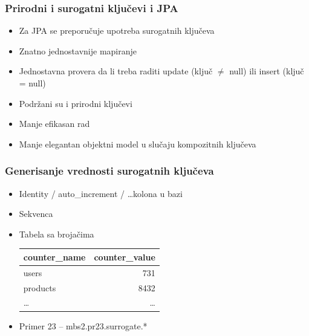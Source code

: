\documentclass[compress]{beamer}
\begin{document}
\begin{frame}
  \frametitle{Prirodni i surogatni ključevi i JPA}
  \begin{itemize}
    \item Za JPA se preporučuje upotreba surogatnih ključeva
    \item Znatno jednostavnije mapiranje
    \item Jednostavna provera da li treba raditi update (ključ $\neq$ null) ili insert (ključ = null)
  \end{itemize}

  \begin{itemize}
    \item Podržani su i prirodni ključevi
    \item Manje efikasan rad
    \item Manje elegantan objektni model u slučaju kompozitnih ključeva
  \end{itemize}
\end{frame}
\begin{frame}
  \frametitle{Generisanje vrednosti surogatnih ključeva}
  \begin{itemize}
    \item Identity / auto\_increment / \ldots kolona u bazi
    \item Sekvenca
    \item Tabela sa brojačima \\
    \small{\begin{tabular}{l|r}
      \textbf{counter\_name} & \textbf{counter\_value} \\ \hline
      users & 731 \\ 
      products & 8432 \\
      \ldots & \ldots
    \end{tabular}}
  \end{itemize}

  \begin{itemize}
    \item Primer 23 -- mbs2.pr23.surrogate.*
  \end{itemize}
\end{frame}
\end{document}
